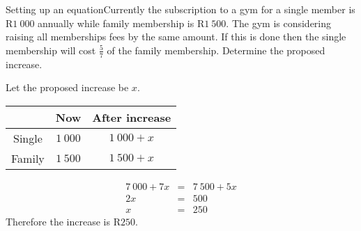 \begin{wex}{Setting up an equation}{Currently the subscription to a gym for a single member is R$1~000$ annually while family membership is R$1~500$.  The gym is considering raising all memberships fees by the same amount.  If this is done then the single membership will cost $\frac{5}{7}$ of the family membership.  Determine the proposed increase.\\}{
Let the proposed increase be $x$.\\
\vspace{0.5cm}
\begin{center}
\begin{tabular}{|c|c|c|}\hline
& Now & After increase\\\hline
Single& $1~000$ & $1~000+x$\\\hline
Family& $1~500$ & $1~500+x$\\\hline
\end{tabular}
\end{center}
\begin{eqnarray*}
7~000 + 7x &=& 7~500  + 5x\\
2x &=& 500\\
x &=& 250
\end{eqnarray*}
Therefore the increase is R$250$.
}
\end{wex}

